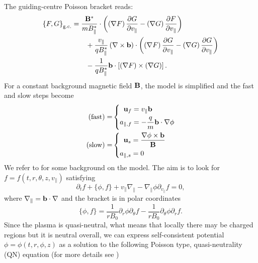 The guiding-centre Poisson bracket reads:
\begin{subequations}
	\begin{align}
		\left\{ F, G \right\}_{\text{g.c.}} & = \frac{\mathbf{B}^\ast}{m B_\parallel^\ast} \cdot \left( \left(\nabla F\right) \frac{\partial G}{\partial v_\parallel} - \left(\nabla G\right) \frac{\partial F}{\partial v_\parallel} \right) \label{gc Pb part 1} \\
		& \qquad + \frac{v_\parallel}{q B_\parallel^\ast} \left( \nabla \times \mathbf{b} \right) \cdot \left( \left(\nabla F\right) \frac{\partial G}{\partial v_\parallel} - \left(\nabla G\right) \frac{\partial G}{\partial v_\parallel} \right) \label{gc Pb part 2} \\
		& \qquad - \frac{1}{q B_\parallel^\ast} \mathbf{b} \cdot \left[\left(\nabla F\right) \times \left(\nabla G\right)\right]. \label{gc Pb part 3}
	\end{align}
\end{subequations}
For a constant background magnetic field $\mathbf{B}$, the model is simplified and the fast and slow steps become 
\begin{subequations}
	\begin{align}
		(\text{fast}) = & \left\{ \begin{aligned}
			\mathbf{u}_f & = {v_\parallel} \mathbf{b} \\
			a_{\parallel, f} & = -\frac{q}{m} \mathbf{b} \cdot \nabla \phi
		\end{aligned} \right. \label{split step fast const B}\\
		(\text{slow}) = &  \left\{ \begin{aligned}
			\mathbf{u}_s & = \frac{\nabla \phi\times \mathbf{b}}{\mathbf{B}}  \\
			a_{\parallel, s} & = 0
		\end{aligned} \right. \label{split step slow const B}
	\end{align}
\end{subequations}
We refer to \cite{Latu_2017} for some background on the model. The aim is to look for $f = f(t, r, \theta, z, v_\parallel)$ satisfying
\begin{equation}
\partial_t f + \{\phi, f\} + v_\parallel \nabla_\parallel - \nabla_\parallel \phi \partial_{v_\parallel}f = 0, \label{eq:GK_model}
\end{equation}
where $\nabla_\parallel = \mathbf{b} \cdot \nabla$ and the bracket is in polar coordinates
\begin{equation}
\{\phi, f \} = \frac{1}{rB_0}\partial_r \phi\partial_\theta f -\frac{1}{rB_0}\partial_\theta \phi\partial_r f. \label{eq:bracket_in_polar}
\end{equation}
Since the plasma is quasi-neutral, what means that locally there may be charged regions but it is neutral overall, we can express self-consistent potential $\phi = \phi(t, r, \phi, z)$ as a solution to the following Poisson type, quasi-neutrality (QN) equation (for more details see \cite{emily})
